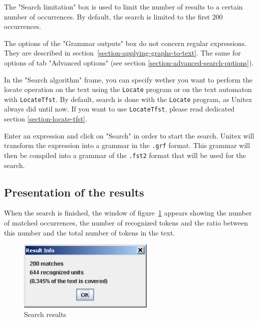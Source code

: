 \bigskip
\noindent The "Search limitation" box is used to  limit the number of results 
to a certain number of occurrences. By default, the search is limited to the first 200
occurrences.

\bigskip
\noindent The options of the "Grammar outputs" box do not concern regular
expressions. They are described in 
section~\ref{section-applying-graphs-to-text}. The same for options of tab
"Advanced options" (see section \ref{section-advanced-search-options}).

\bigskip
\noindent In the "Search algorithm" frame, you can specify wether you want to
perform the locate operation on the text using the \verb+Locate+ program or on
the text automaton with \verb+LocateTfst+. By default, search is done with the
\verb+Locate+ program, as Unitex always did until now. If you want to use
\verb+LocateTfst+, please read dedicated section \ref{section-locate-tfst}.

\bigskip
\noindent Enter an expression and click on "Search" in order to start the
search. Unitex will transform the expression into a grammar in the \verb+.grf+ format.
 This grammar will then be compiled into a grammar of
the \verb+.fst2+ format that will be used for the
search.

\subsection{Presentation of the results}
\label{section-display-occurrences}
When the search is finished, the window of
figure~\ref{fig-search-results} appears showing the number of matched
occurrences, the number of recognized tokens and the ratio between this 
number and the total number of tokens in the text.

\bigskip
\begin{figure}[!ht]
\begin{center}
\includegraphics[width=6.5cm]{resources/img/fig4-5.png}
\caption{Search results \label{fig-search-results}}
\end{center}
\end{figure}

